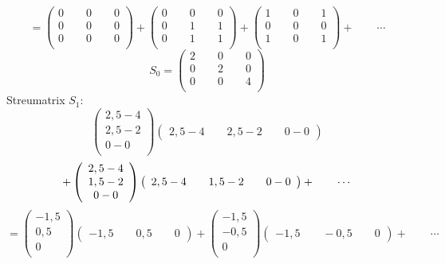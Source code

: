\documentclass{article}
\begin{document}
\[
= 
\left(
\begin {array} {c}
0 \qquad 0 \qquad 0 \\
0 \qquad 0 \qquad 0  \\
0 \qquad 0 \qquad 0  \\
\end {array}
\right)
+
\left(
\begin {array} {c}
0 \qquad 0 \qquad 0  \\
0 \qquad 1 \qquad 1  \\
0 \qquad 1 \qquad 1  \\
\end {array}
\right)
+
\left(
\begin {array} {c}
1 \qquad 0 \qquad 1  \\
0 \qquad 0 \qquad 0  \\
1 \qquad 0 \qquad 1  \\
\end {array}
\right)
+ \qquad \cdots
\]
\[
S_0 =
\left(
\begin {array} {c}
2 \qquad 0 \qquad 0  \\
0 \qquad 2 \qquad 0  \\
0 \qquad 0 \qquad 4  \\
\end {array}
\right)
\]
Streumatrix $S_1$: 
\[
\left(
\begin {array} {c}
2,5 - 4 \\
2,5 - 2 \\
0 - 0 \\
\end {array}
\right)
\left(
\begin {array} {c}
2,5 - 4 \qquad 2,5 - 2 \qquad 0 - 0 
\end {array}
\right)
\]
\[ 
+
\left(
\begin {array} {c}
2,5 - 4 \\
1,5 - 2 \\
0 - 0 \\
\end {array}
\right)
\left(
\begin {array} {c}
2,5 - 4 \qquad 1,5 - 2 \qquad 0 - 0 
\end {array}
\right)
+ \qquad \cdots \\ 
\]
\[
= 
\left(
\begin {array} {c}
-1,5 \\
0,5 \\
0 \\
\end {array}
\right)
\left(
\begin {array} {c}
-1,5 \qquad 0,5 \qquad 0 
\end {array}
\right)
+
\left(
\begin {array} {c}
-1,5 \\
-0,5 \\
0 \\
\end {array}
\right)
\left(
\begin {array} {c}
-1,5 \qquad -0,5 \qquad 0 
\end {array}
\right) 
+ \qquad \cdots
\]
\end{document}

